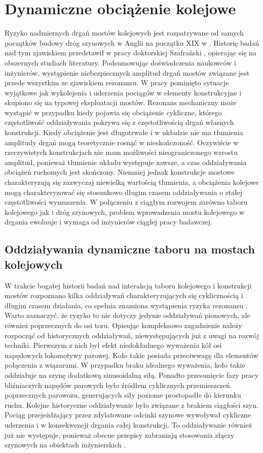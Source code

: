 \section{Dynamiczne obciążenie kolejowe}
Ryzyko nadmiernych drgań mostów kolejowych jest rozpatrywane od samych początków budowy dróg szynowych w Anglii na początku XIX w \parencite{Ladislav1996}. Historię badań nad tym zjawiskiem przedstawił w pracy doktorskiej Szafrański \cite{Szafranski2013}, opierając się na obszernych studiach literatury. Podsumowując doświadczenia naukowców i inżynierów, wystąpienie niebezpiecznych amplitud drgań mostów związane jest przede wszystkim ze zjawiskiem rezonansu. W pracy pominięto sytuacje wyjątkowe jak wykolejenia i uderzenia pociągów w elementy konstrukcyjne i skupiono się na typowej eksploatacji mostów. Rezonans mechaniczny może wystąpić w przypadku kiedy pojawia się obciążenie cykliczne, którego częstotliwość oddziaływania pokrywa się z częstotliwością drgań własnych konstrukcji. Kiedy obciążenie jest długotrwałe i w układzie nie ma tłumienia amplitudy drgań mogą teoretycznie rosnąć w nieskończoność. Oczywiście w rzeczywistych konstrukcjach nie mam możliwości nieograniczonego wzrostu amplitud, ponieważ tłumienie układu występuje zawsze, a czas oddziaływania obciążeń ruchomych jest skończony. Niemniej jednak konstrukcje mostowe charakteryzują się zazwyczaj niewielką wartością tłumienia, a obciążenia kolejowe mogą charakteryzować się stosunkowo długim czasem oddziaływania o stałej częstotliwości wymuszenia. W połączeniu z ciągłym rozwojem zarówno taboru kolejowego jak i dróg szynowych, problem wprowadzenia mostu kolejowego w drgania ewoluuje i wymaga od inżynierów ciągłej pracy badawczej.


\subsection{Oddziaływania dynamiczne taboru na mostach kolejowych}
W trakcie bogatej historii badań nad interakcją taboru kolejowego i konstrukcji mostów rozpoznano kilka oddziaływań charakteryzujących się cyklicznością i długim czasem działania, co spełnia znamiona wystąpienia ryzyka rezonansu \parencite{Fryba2001}. Warto zaznaczyć, że ryzyko to nie dotyczy jedynie oddziaływań pionowych, ale również poprzecznych do osi toru. Opisując kompleksowo zagadnienie należy rozpocząć od historycznych oddziaływań, niewystępujących już z uwagi na rozwój techniki. Pierwszym z nich był efekt niedokładnego wyważenia kół osi napędowych lokomotywy parowej. Koło takie posiada przeciwwagę dla elementów połączenia z wiązarami. W przypadku braku idealnego wyważenia, koło takie oddziałuje na szynę dodatkową sinusoidalną siłą. Ponadto przesunięcie fazy pracy bliźniaczych napędów parowych było źródłem cyklicznych przemieszczeń poprzecznych parowozu, generujących siły poziome prostopadłe do kierunku ruchu. Kolejne historyczne oddziaływanie było związane z brakiem ciągłości szyn. Pociąg przejeżdżający przez zdylatowane odcinki szynowe wywoływał cykliczne uderzenia i w konsekwencji drgania całej konstrukcji. To oddziaływanie również już nie występuje, ponieważ obecne przepisy zabraniają stosowania złączy szynowych na obiektach inżynierskich \parencite{PKPPolskieLinieKolejoweS.A.2005}.

